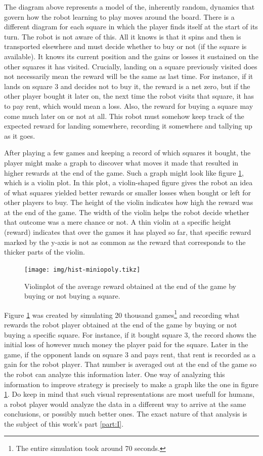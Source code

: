 The diagram above represents a model of the, inherently random, dynamics that
govern how the robot learning to play moves around the board. There is a
different diagram for each square in which the player finds itself at the start
of its turn. The robot is not aware of this. All it knows is that it spins and
then is transported elsewhere and must decide whether to buy or not (if the
square is available). It knows its current position and the gains or losses it
sustained on the other squares it has visited. Crucially, landing on a square
previously visited does not necessarily mean the reward will be the same as last
time. For instance, if it lands on square 3 and decides not to buy it, the
reward is a net zero, but if the other player bought it later on, the next time
the robot visits that square, it has to pay rent, which would mean a loss. Also,
the reward for buying a square may come much later on or not at all. This robot
must somehow keep track of the expected reward for landing somewhere, recording
it somewhere and tallying up as it goes.

After playing a few games and keeping a record of which squares it bought, the
player might make a graph to discover what moves it made that resulted in higher
rewards at the end of the game. Such a graph might look like figure
\ref{fig:violinplot}, which is a violin plot. In this plot, a violin-shaped
figure gives the robot an idea of what squares yielded better rewards or smaller
losses when bought or left for other players to buy. The height of the violin
indicates how high the reward was at the end of the game. The width of the
violin helps the robot decide whether that outcome was a mere chance or not.  A
thin violin at a specific height (reward) indicates that over the games it has
played so far, that specific reward marked by the y-axis is not as common as
the reward that corresponds to the thicker parts of the violin.

\begin{figure}
\centering
\texttt{[image: img/hist-miniopoly.tikz]}
\caption{Violinplot of the average reward obtained at the end 
of the game by buying or not buying a square.}
\label{fig:violinplot}
\end{figure}

Figure \ref{fig:violinplot} was created by simulating 20 thousand
games\footnote{The entire simulation took around 70 seconds.} and recording what
rewards the robot player obtained at the end of the game by buying or not buying
a specific square. For instance, if it bought square 3, the record shows the
initial loss of however much money the player paid for the square. Later in the
game, if the opponent lands on square 3 and pays rent, that rent is recorded as
a gain for the robot player. That number is averaged out at the end of the game
so the robot can analyze this information later. One way of analyzing this
information to improve strategy is precisely to make a graph like the one in
figure \ref{fig:violinplot}. Do keep in mind that such visual representations
are most usefull for humans, a robot player would analyze the data in a
different way to arrive at the same conclusions, or possibly much better ones.
The exact nature of that analysis is the subject of this work's part
\ref{part:I}.

